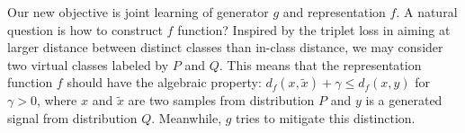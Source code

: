 Our new objective is joint learning of generator $g$ and representation $f$. A natural question is how to construct $f$ function? {Inspired by the triplet loss in \cite{7298682} aiming at larger distance between distinct classes than in-class distance, we may consider two virtual classes labeled by $P$ and $Q$.
This means that the representation function $f$ should have the algebraic property: $ d_f(x, \tilde{x}) + \gamma \leq d_f(x, y) $ for $\gamma > 0$, where $x$ and $\tilde{x}$ are two samples from distribution $P$ and $y$ is a generated signal from distribution $Q$. Meanwhile, $g$ tries to mitigate this distinction.} %

